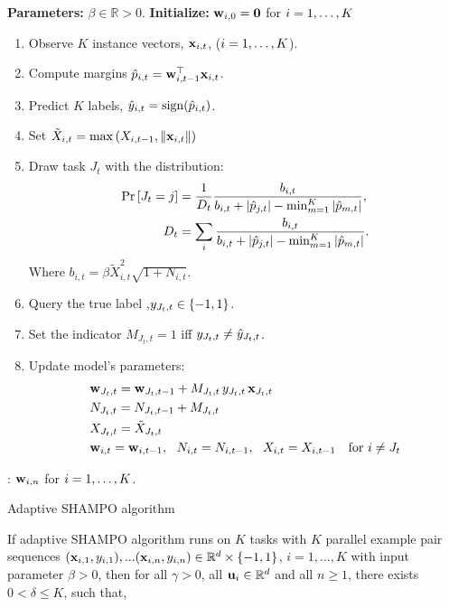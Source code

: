 {\begin{algorithm}[!h]
\begin{algorithmic}
   \State \textbf{Parameters:}  $\beta\in\mathbb{R}>0$.
   \State \textbf{Initialize:} $\mathbf{w}_{i,0}={\boldsymbol{0}}$ for $i=1, \ldots , K$\\
   \begin{enumerate}
\nolineskips
\item Observe $K$ instance vectors, $\mathbf{x}_{i,t}$, ($i=1 , \ldots , K$).
\item Compute margins $\hat{p}_{i,t}={\mathbf{w}}^{\top}_{i,t-1} \mathbf{x}_{i,t}$.
\item Predict $K$ labels, $\hat{y}_{i,t}={\rm sign}(\hat{p}_{i,t})$.
\item Set $\tilde{X}_{i,t}=\max\left({X_{i,t-1},\Vert\mathbf{x}_{i,t}\Vert}\right)$
\item Draw task $J_t$  with the distribution:
\begin{align}
{\rm Pr}\left[{J_t=j}\right] &=
\frac{1}{D_t}\frac{b_{i,t}}{b_{i,t}+\left\vert{\hat{p}_{j,t}}\right\vert-\min_{m=1}^K\left\vert{\hat{p}_{m,t}}\right\vert},\nonumber\\
D_t &=
\sum_i \frac{b_{i,t}}{b_{i,t}+\left\vert{\hat{p}_{j,t}}\right\vert-\min_{m=1}^K\left\vert{\hat{p}_{m,t}}\right\vert}.\nonumber
\end{align}
Where $b_{i,t} = \beta \tilde{X}_{i,t}^2\sqrt{1+N_{i,t}}$.
\item Query the true label ,$y_{J_t,t}\in\{-1,1\}$.
\item Set the indicator $M_{J_t, t}=1$ iff $y_{J_t,t} \neq \hat{y}_{J_t,t}$.
\item Update model's parameters:
\begin{align*}
&\mathbf{w}_{J_t,t} = \mathbf{w}_{J_t,t-1}+M_{J_t,t} \, y_{J_t,t}\, \mathbf{x}_{J_t,t} \\
&N_{J_t,t} = N_{J_t,t-1} +M_{J_t,t} \\
&X_{J_t,t} = \tilde{X}_{J_t,t} \\
&\mathbf{w}_{i,t} = \mathbf{w}_{i,t-1},~~ N_{i,t} = N_{i,t-1}, ~~X_{i,t} = X_{i,t-1}~~ \textrm{ for } i \neq J_t
\end{align*}
\end{enumerate}   \EndFor  
   : $\mathbf{w}_{i,n}$ for $i=1 , \ldots , K$.
\end{algorithmic}
\caption{Adaptive SHAMPO algorithm \label{alg:SHAMPO_adaptive}}
\end{algorithm}

\begin{theorem}
  If adaptive SHAMPO algorithm runs on $K$ tasks with $K$ parallel example pair
  sequences
  $(\mathbf{x}_{i,1},y_{i,1}),...(\mathbf{x}_{i,n},y_{i,n})\in\mathbb{R}^d\times\{-1,1\}$,
  $i=1,...,K$ with input parameter $\beta>0$, then for all $\gamma>0$, all
  $\mathbf{u}_{i}\in\mathbb{R}^d$ and all $n\ge1$, there exists $0<\delta\le K$, such that,
  

\end{theorem}}
